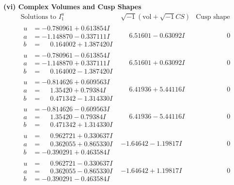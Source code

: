 \documentclass[1p]{elsarticle_modified}
\theoremstyle{definition}
\newcommand{\I}{\sqrt{-1}}
\begin{document}
\newpage\flushleft \textbf{(vi) Complex Volumes and Cusp Shapes}
$$\begin{array}{c|c|c}  
\text{Solutions to }I^u_{1}& \I (\text{vol} + \sqrt{-1}CS) & \text{Cusp shape}\\
 \hline 
\begin{aligned}
u &= -0.780961 + 0.613854 I \\
a &= -1.148870 - 0.337111 I \\
b &= \phantom{-}0.164002 + 1.387420 I\end{aligned}
 & \phantom{-}6.51601 - 0.63092 I & \phantom{-0.000000 } 0 \\ \hline\begin{aligned}
u &= -0.780961 - 0.613854 I \\
a &= -1.148870 + 0.337111 I \\
b &= \phantom{-}0.164002 - 1.387420 I\end{aligned}
 & \phantom{-}6.51601 + 0.63092 I & \phantom{-0.000000 } 0 \\ \hline\begin{aligned}
u &= -0.814626 + 0.609563 I \\
a &= \phantom{-}1.35420 + 0.79384 I \\
b &= \phantom{-}0.471342 - 1.314330 I\end{aligned}
 & \phantom{-}6.41936 + 5.44116 I & \phantom{-0.000000 } 0 \\ \hline\begin{aligned}
u &= -0.814626 - 0.609563 I \\
a &= \phantom{-}1.35420 - 0.79384 I \\
b &= \phantom{-}0.471342 + 1.314330 I\end{aligned}
 & \phantom{-}6.41936 - 5.44116 I & \phantom{-0.000000 } 0 \\ \hline\begin{aligned}
u &= \phantom{-}0.962721 + 0.330637 I \\
a &= \phantom{-}0.362055 + 0.865330 I \\
b &= -0.390291 + 0.463584 I\end{aligned}
 & -1.64642 - 1.19817 I & \phantom{-0.000000 } 0 \\ \hline\begin{aligned}
u &= \phantom{-}0.962721 - 0.330637 I \\
a &= \phantom{-}0.362055 - 0.865330 I \\
b &= -0.390291 - 0.463584 I\end{aligned}
 & -1.64642 + 1.19817 I & \phantom{-0.000000 } 0 \\ \hline\begin{aligned}

\end{aligned}
\end{array}$$
\end{document}
